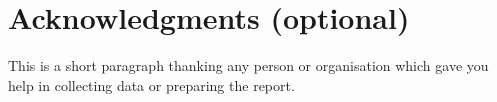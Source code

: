 \chapter*{Acknowledgments (optional)}
This is a short paragraph thanking any person or organisation which gave you help in collecting data or preparing the report.